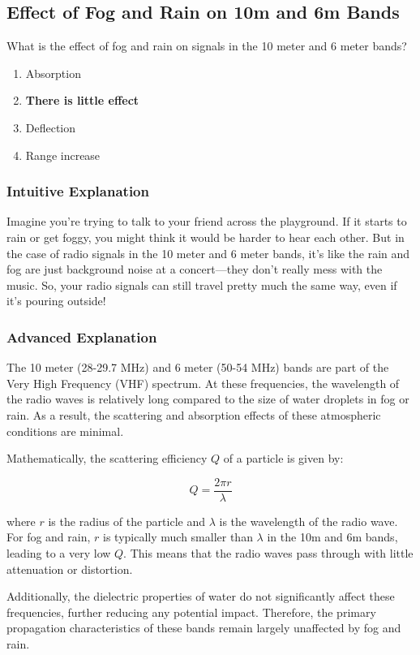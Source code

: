 \subsection{Effect of Fog and Rain on 10m and 6m Bands}
\label{T3A12}

\begin{tcolorbox}[colback=gray!10!white,colframe=black!75!black,title=T3A12]
What is the effect of fog and rain on signals in the 10 meter and 6 meter bands?
\begin{enumerate}[label=\Alph*)]
    \item Absorption
    \item \textbf{There is little effect}
    \item Deflection
    \item Range increase
\end{enumerate}
\end{tcolorbox}

\subsubsection{Intuitive Explanation}
Imagine you're trying to talk to your friend across the playground. If it starts to rain or get foggy, you might think it would be harder to hear each other. But in the case of radio signals in the 10 meter and 6 meter bands, it's like the rain and fog are just background noise at a concert—they don't really mess with the music. So, your radio signals can still travel pretty much the same way, even if it's pouring outside!

\subsubsection{Advanced Explanation}
The 10 meter (28-29.7 MHz) and 6 meter (50-54 MHz) bands are part of the Very High Frequency (VHF) spectrum. At these frequencies, the wavelength of the radio waves is relatively long compared to the size of water droplets in fog or rain. As a result, the scattering and absorption effects of these atmospheric conditions are minimal.

Mathematically, the scattering efficiency \( Q \) of a particle is given by:

\[ Q = \frac{2\pi r}{\lambda} \]

where \( r \) is the radius of the particle and \( \lambda \) is the wavelength of the radio wave. For fog and rain, \( r \) is typically much smaller than \( \lambda \) in the 10m and 6m bands, leading to a very low \( Q \). This means that the radio waves pass through with little attenuation or distortion.

Additionally, the dielectric properties of water do not significantly affect these frequencies, further reducing any potential impact. Therefore, the primary propagation characteristics of these bands remain largely unaffected by fog and rain.


